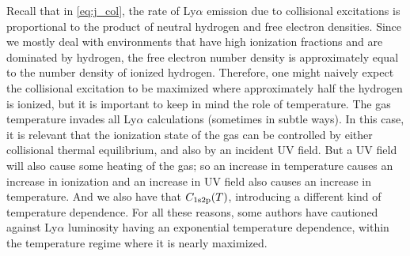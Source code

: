 Recall that in \ref{eq:j_col}, the rate of Ly$\alpha$ emission due to collisional excitations is proportional to the product of neutral hydrogen and free electron densities.
Since we mostly deal with environments that have high ionization fractions and are dominated by hydrogen, the free electron number density is approximately equal to the number density of ionized hydrogen.
Therefore, one might naively expect the collisional excitation to be maximized where approximately half the hydrogen is ionized, but it is important to keep in mind the role of temperature.
The gas temperature invades all Ly$\alpha$ calculations (sometimes in subtle ways).
In this case, it is relevant that the ionization state of the gas can be controlled by either collisional thermal equilibrium, and also by an incident UV field.
But a UV field will also cause some heating of the gas; so an increase in temperature causes an increase in ionization and an increase in UV field also causes an increase in temperature.
And we also have that $C_{\rm 1s2p}(T)$, introducing a different kind of temperature dependence.
For all these reasons, some authors \citep[e.g.][]{Faucher-Giguere2010} have cautioned against Ly$\alpha$ luminosity having an exponential temperature dependence, within the temperature regime where it is nearly maximized.

